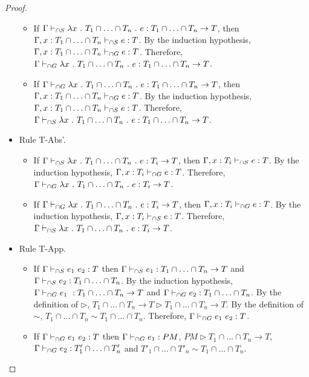 \documentclass[a4paper]{article}
\begin{document}
\begin{proof}
\begin{itemize}
\begin{itemize}
        \item If $\Gamma \sits \lambda x\ .\ T_1 \cap \ldots \cap T_n\ .\ e : T_1 \cap \ldots \cap T_n \rightarrow T$, then $\Gamma, x : T_1 \cap \ldots \cap T_n \vdash_{\cap S} e : T$.
        By the induction hypothesis, $\Gamma, x : T_1 \cap \ldots \cap T_n \vdash_{\cap G} e : T$.
        Therefore, $\Gamma \gits \lambda x\ .\ T_1 \cap \ldots \cap T_n\ .\ e : T_1 \cap \ldots \cap T_n \rightarrow T$.
        \item If $\Gamma \gits \lambda x\ .\ T_1 \cap \ldots \cap T_n\ .\ e : T_1 \cap \ldots \cap T_n \rightarrow T$, then $\Gamma, x : T_1 \cap \ldots \cap T_n \vdash_{\cap G} e : T$.
        By the induction hypothesis, $\Gamma, x : T_1 \cap \ldots \cap T_n \vdash_{\cap S} e : T$.
        Therefore, $\Gamma \sits \lambda x\ .\ T_1 \cap \ldots \cap T_n\ .\ e : T_1 \cap \ldots \cap T_n \rightarrow T$.
    \end{itemize}
    \item Rule T-Abs'.
    \begin{itemize}
        \item If $\Gamma \vdash_{\cap S} \lambda x\ .\ T_1 \cap \ldots \cap T_n\ .\ e : T_i \rightarrow T$, then $\Gamma, x : T_i \vdash_{\cap S} e : T$.
        By the induction hypothesis, $\Gamma, x : T_i \vdash_{\cap G} e : T$.
        Therefore, $\Gamma \vdash_{\cap G} \lambda x\ .\ T_1 \cap \ldots \cap T_n\ .\ e : T_i \rightarrow T$.
        \item If $\Gamma \vdash_{\cap G} \lambda x\ .\ T_1 \cap \ldots \cap T_n\ .\ e : T_i \rightarrow T$, then $\Gamma, x : T_i \vdash_{\cap G} e : T$.
        By the induction hypothesis, $\Gamma, x : T_i \vdash_{\cap S} e : T$.
        Therefore, $\Gamma \vdash_{\cap S} \lambda x\ .\ T_1 \cap \ldots \cap T_n\ .\ e : T_i \rightarrow T$.
    \end{itemize}
    \item Rule T-App.
    \begin{itemize}
        \item If $\Gamma \vdash_{\cap S} e_1\ e_2 : T$ then $\Gamma \vdash_{\cap S} e_1 : T_1 \cap \ldots \cap T_n \rightarrow T$ and $\Gamma \vdash_{\cap S} e_2 : T_1 \cap \ldots \cap T_n$.
        By the induction hypothesis, $\Gamma \vdash_{\cap G} e_1\ : T_1 \cap \ldots \cap T_n \rightarrow T$ and $\Gamma \vdash_{\cap G} e_2 : T_1 \cap \ldots \cap T_n$.
        By the definition of $\rhd$, $T_1 \cap \ldots \cap T_n \rightarrow T \rhd T_1 \cap \ldots \cap T_n \rightarrow T$.
        By the definition of $\sim$, $T_1 \cap \ldots \cap T_n \sim T_1 \cap \ldots \cap T_n$.
        Therefore, $\Gamma \vdash_{\cap G} e_1\ e_2 : T$.
        \item If $\Gamma \vdash_{\cap G} e_1\ e_2 : T$ then $\Gamma \vdash_{\cap G} e_1 : PM$, $PM \rhd T_1 \cap \ldots \cap T_n \rightarrow T$, $\Gamma \vdash_{\cap G} e_2 : T'_1 \cap \ldots \cap T'_n$ and $T'_1 \cap \ldots \cap T'_n \sim T_1 \cap \ldots \cap T_n$.

\end{itemize}
\end{itemize}
\end{proof}
\end{document}
